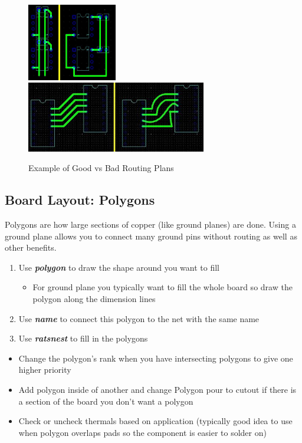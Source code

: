 \documentclass{article}
\begin{document}
\begin{figure}
	\center
	\includegraphics[width=0.35\textwidth,height=0.4\textheight,keepaspectratio]{routingvs1}
	\\
	\includegraphics[width=0.7\textwidth,height=0.6\textheight,keepaspectratio]{routingvs2}
	\caption {Example of Good vs Bad Routing Plans}
	\label{img:routing2}
\end{figure}

\subsection{Board Layout: Polygons}
Polygons are how large sections of copper (like ground planes) are done. Using a ground plane allows you to connect many ground pins without routing as well as other benefits.
\begin{enumerate}
    \item Use \textit{\textbf{polygon}} to draw the shape around you want to
    fill
    \begin{itemize}
        \item For ground plane you typically want to fill the whole board so draw the polygon along the dimension lines
    \end{itemize}
    \item Use \textit{\textbf{name}} to connect this polygon to the net with the same name
    \item Use \textit{\textbf{ratsnest}} to fill in the polygons
\end{enumerate}
\begin{tcolorbox} [title=Tips \& Tricks]
    \begin{itemize}
        \item Change the polygon's rank when you have intersecting polygons to give one higher priority
        \item Add polygon inside of another and change Polygon pour to cutout if there is a section of the board you don't want a polygon
        \item Check or uncheck thermals based on application (typically good idea to use when polygon overlaps pads so the component is easier to solder on)
    \end{itemize}
\end{tcolorbox}
\end{document}
